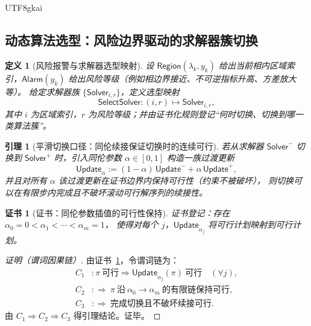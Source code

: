 \documentclass[12pt]{article}
\newtheorem{definition}{定义}[section]
\newtheorem{lemma}{引理}[section]
\newtheorem{Certificate}{证书}[section]
\begin{document}
\begin{CJK*}{UTF8}{gkai}
\subsection{动态算法选型：风险边界驱动的求解器簇切换}
\label{sec:dynamic-solver-selection}

\begin{definition}[风险报警与求解器选型映射]
设 $\mathsf{Region}(\lambda_k,y_k)$ 给出当前相内区域索引，$\mathsf{Alarm}(y_k)$ 给出风险等级（例如相边界接近、不可逆指标升高、方差放大等）。
给定求解器族 $\{\mathsf{Solver}_{i,r}\}$，定义选型映射
\[
  \mathsf{SelectSolver}:(i,r)\mapsto \mathsf{Solver}_{i,r},
\]
其中 $i$ 为区域索引，$r$ 为风险等级；并由证书化规则登记“何时切换、切换到哪一类算法簇”。
\end{definition}

\begin{lemma}[平滑切换口径：同伦续接保证切换时的连续可行]
\label{lem:smooth-switching-preserves-feasibility}
若从求解器 $\mathsf{Solver}^-$ 切换到 $\mathsf{Solver}^+$ 时，引入同伦参数 $\alpha\in[0,1]$ 构造一族过渡更新
\[
  \mathsf{Update}_{\alpha} := (1-\alpha)\,\mathsf{Update}^- + \alpha\,\mathsf{Update}^+,
\]
并且对所有 $\alpha$ 该过渡更新在证书边界内保持可行性（约束不被破坏），
则切换可以在有限步内完成且不破坏滚动可行解序列的续接性。
\end{lemma}

\begin{Certificate}[证书：同伦参数插值的可行性保持]
\label{cert:smooth-switching-preserves-feasibility}
证书登记：存在 $\alpha_0=0<\alpha_1<\cdots<\alpha_m=1$，
使得对每个 $j$，$\mathsf{Update}_{\alpha_j}$ 将可行计划映射到可行计划。
\end{Certificate}

\begin{proof}[证明（谓词因果链）]
由证书~\ref{cert:smooth-switching-preserves-feasibility}，令谓词链为：
\[
\begin{aligned}
  C_1 &: \pi\ \text{可行}\Rightarrow \mathsf{Update}_{\alpha_j}(\pi)\ \text{可行}\quad(\forall j),\\
  C_2 &: \Rightarrow\ \pi\ \text{沿}\ \alpha_0\to\alpha_m\ \text{的有限链保持可行},\\
  C_3 &: \Rightarrow\ \text{完成切换且不破坏续接可行}.
\end{aligned}
\]
由 $C_1\Rightarrow C_2\Rightarrow C_3$ 得引理结论。证毕。
\end{proof}


\end{CJK*}
\end{document}
